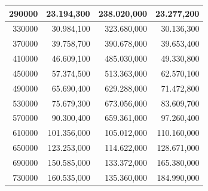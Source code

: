 \documentclass[a4paper, 12pt]{article}
\begin{document}
\begin{longtable}[c]{@{}rrrr@{}}
	\multicolumn{1}{|r|}{290000}                  & \multicolumn{1}{r|}{23.194,300}        & \multicolumn{1}{r|}{238.020,000}         & \multicolumn{1}{r|}{23.277,200}        \\* \midrule
	\multicolumn{1}{|r|}{330000}                  & \multicolumn{1}{r|}{30.984,100}        & \multicolumn{1}{r|}{323.680,000}         & \multicolumn{1}{r|}{30.136,300}        \\* \midrule
	\multicolumn{1}{|r|}{370000}                  & \multicolumn{1}{r|}{39.758,700}        & \multicolumn{1}{r|}{390.678,000}         & \multicolumn{1}{r|}{39.653,400}        \\* \midrule
	\multicolumn{1}{|r|}{410000}                  & \multicolumn{1}{r|}{46.609,100}        & \multicolumn{1}{r|}{485.030,000}         & \multicolumn{1}{r|}{49.330,800}        \\* \midrule
	\multicolumn{1}{|r|}{450000}                  & \multicolumn{1}{r|}{57.374,500}        & \multicolumn{1}{r|}{513.363,000}         & \multicolumn{1}{r|}{62.570,100}        \\* \midrule
	\multicolumn{1}{|r|}{490000}                  & \multicolumn{1}{r|}{65.690,400}        & \multicolumn{1}{r|}{629.288,000}         & \multicolumn{1}{r|}{71.472,800}        \\* \midrule
	\multicolumn{1}{|r|}{530000}                  & \multicolumn{1}{r|}{75.679,300}        & \multicolumn{1}{r|}{673.056,000}         & \multicolumn{1}{r|}{83.609,700}        \\* \midrule
	\multicolumn{1}{|r|}{570000}                  & \multicolumn{1}{r|}{90.300,400}        & \multicolumn{1}{r|}{659.361,000}         & \multicolumn{1}{r|}{97.260,400}        \\* \midrule
	\multicolumn{1}{|r|}{610000}                  & \multicolumn{1}{r|}{101.356,000}       & \multicolumn{1}{r|}{105.012,000}         & \multicolumn{1}{r|}{110.160,000}       \\* \midrule
	\multicolumn{1}{|r|}{650000}                  & \multicolumn{1}{r|}{123.253,000}       & \multicolumn{1}{r|}{114.622,000}         & \multicolumn{1}{r|}{128.671,000}       \\* \midrule
	\multicolumn{1}{|r|}{690000}                  & \multicolumn{1}{r|}{150.585,000}       & \multicolumn{1}{r|}{133.372,000}         & \multicolumn{1}{r|}{165.380,000}       \\* \midrule
	\multicolumn{1}{|r|}{730000}                  & \multicolumn{1}{r|}{160.535,000}       & \multicolumn{1}{r|}{135.360,000}         & \multicolumn{1}{r|}{184.990,000}       \\* \midrule

\end{longtable}
\end{document}
